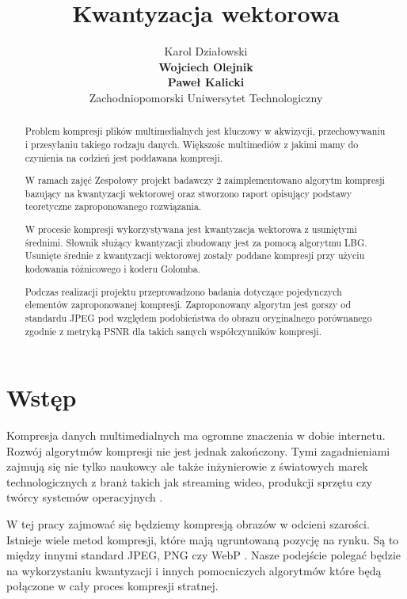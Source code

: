 \documentclass{article}
\title{Kwantyzacja wektorowa}
\author{
  Karol Działowski \\
  \textbf{Wojciech Olejnik} \\
  \textbf{Paweł Kalicki} \\
  Zachodniopomorski Uniwersytet Technologiczny
}
\begin{document}
\maketitle
\begin{abstract}
Problem kompresji plików multimedialnych jest kluczowy w akwizycji, przechowywaniu i przesyłaniu takiego rodzaju danych. Większośc multimediów z jakimi mamy do czynienia na codzień jest poddawana kompresji.

W ramach zajęć Zespołowy projekt badawczy 2 zaimplementowano algorytm kompresji bazujący na kwantyzacji wektorowej oraz stworzono raport opisujący podstawy teoretyczne zaproponowanego rozwiązania. 

W procesie kompresji wykorzystywana jest kwantyzacja wektorowa z usuniętymi średnimi. Słownik służący kwantyzacji zbudowany jest za pomocą algorytmu LBG. Usunięte średnie z kwantyzacji wektorowej zostały poddane kompresji przy użyciu kodowania różnicowego i koderu Golomba.

Podczas realizacji projektu przeprowadzono badania dotyczące pojedynczych elementów zaproponowanej kompresji. Zaproponowany algorytm jest gorszy od standardu JPEG pod względem podobieństwa do obrazu oryginalnego porównanego zgodnie z metryką PSNR dla takich samych współczynników kompresji.
\end{abstract}

\newpage

\tableofcontents

\newpage



\section{Wstęp}

Kompresja danych multimedialnych ma ogromne znaczenia w dobie internetu. Rozwój algorytmów kompresji nie jest jednak zakończony. Tymi zagadnieniami zajmują się nie tylko naukowcy ale także inżynierowie z światowych marek technologicznych z branż takich jak streaming wideo, produkcji sprzętu czy twórcy systemów operacyjnych \cite{intel}.

W tej pracy zajmować się będziemy kompresją obrazów w odcieni szarości. Istnieje wiele metod kompresji, które mają ugruntowaną pozycję na rynku. Są to między innymi standard JPEG, PNG czy WebP \cite{ginesu2012objective}. Nasze podejście polegać będzie na wykorzystaniu kwantyzacji i innych pomocniczych algorytmów które będą połączone w cały proces kompresji stratnej.
\end{document}
